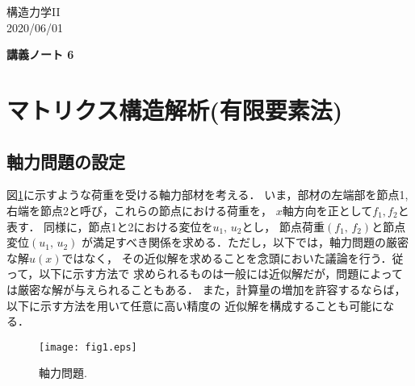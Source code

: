 \documentclass[10pt,a4j]{jarticle}
\newlength{\minitwocolumn}
\begin{document}
\newcommand{\fat}[1]{\mbox{\boldmath $#1$}}
\newcommand{\D}{\partial}
\newcommand{\w}{\omega}
\newcommand{\ga}{\alpha}
\newcommand{\gb}{\beta}
\newcommand{\gx}{\xi}
\newcommand{\gz}{\zeta}
\newcommand{\vhat}[1]{\hat{\fat{#1}}}
\newcommand{\spc}{\vspace{0.7\baselineskip}}
\newcommand{\halfspc}{\vspace{0.3\baselineskip}}

\newcommand{\twofig}[2]
 {
   \begin{figure}
     \begin{minipage}[t]{\minitwocolumn}
         \begin{center}   #1
         \end{center}
     \end{minipage}
         \hspace{\columnsep}
     \begin{minipage}[t]{\minitwocolumn}
         \begin{center} #2
         \end{center}
     \end{minipage}
   \end{figure}
 }
\begin{flushright}
	構造力学II\\
	2020/06/01
\end{flushright}
\begin{center}
	{\LARGE  \bf 講義ノート 6} \\
\end{center}
\setcounter{section}{5}
\section{マトリクス構造解析(有限要素法)}
\subsection{軸力問題の設定}
図\ref{fig:fig1}に示すような荷重を受ける軸力部材を考える．
いま，部材の左端部を節点1, 右端を節点2と呼び，これらの節点における荷重を，
$x$軸方向を正として$f_1,f_2$と表す．
同様に，節点1と2における変位を$u_1,\,u_2$とし，
節点荷重$(f_1,\, f_2)$と節点変位$(u_1,\, u_2)$
が満足すべき関係を求める．ただし，以下では，軸力問題の厳密な解$u(x)$ではなく，
その近似解を求めることを念頭においた議論を行う．従って，以下に示す方法で
求められるものは一般には近似解だが，問題によっては厳密な解が与えられることもある．
また，計算量の増加を許容するならば，以下に示す方法を用いて任意に高い精度の
近似解を構成することも可能になる．
\begin{figure}[b]
	\begin{center}
	\texttt{[image: fig1.eps]} 
	\end{center}
	\caption{軸力問題.} 
	\label{fig:fig1}
\end{figure}
\end{document}
